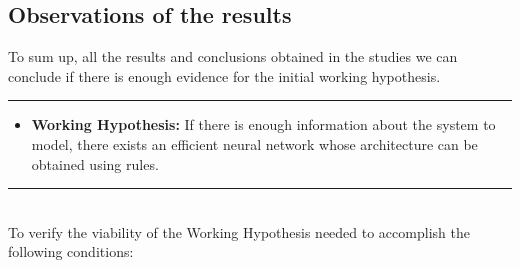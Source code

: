 \documentclass[a4paper, 11pt]{article}
\begin{document}
\subsection{Observations of the results}
To sum up, all the results and conclusions obtained in the studies we can conclude if there is enough evidence for the initial working hypothesis.\\
\rule{\linewidth}{0.4pt}
\begin{itemize}
    \item \textbf{Working Hypothesis:} If there is enough information about the system to model,
    there exists an efficient neural network whose architecture can be obtained using
    rules.
\end{itemize}
\rule{\linewidth}{0.4pt}\\ \vspace{0.5em}
To verify the viability of the Working Hypothesis needed to accomplish the following conditions:
\newpage
\end{document}

